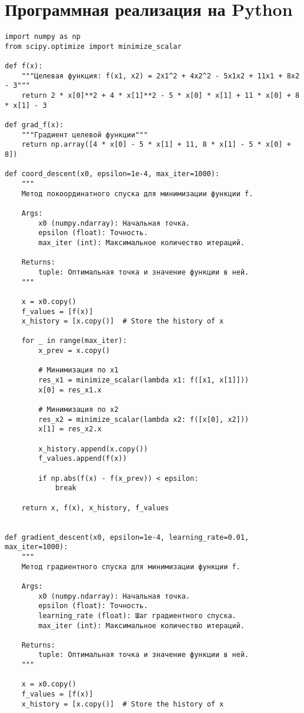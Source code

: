 \documentclass{article}
\begin{document}
\section{Программная реализация на Python}
\begin{lstlisting}
import numpy as np
from scipy.optimize import minimize_scalar

def f(x):
    """Целевая функция: f(x1, x2) = 2x1^2 + 4x2^2 - 5x1x2 + 11x1 + 8x2 - 3"""
    return 2 * x[0]**2 + 4 * x[1]**2 - 5 * x[0] * x[1] + 11 * x[0] + 8 * x[1] - 3

def grad_f(x):
    """Градиент целевой функции"""
    return np.array([4 * x[0] - 5 * x[1] + 11, 8 * x[1] - 5 * x[0] + 8])

def coord_descent(x0, epsilon=1e-4, max_iter=1000):
    """
    Метод покоординатного спуска для минимизации функции f.

    Args:
        x0 (numpy.ndarray): Начальная точка.
        epsilon (float): Точность.
        max_iter (int): Максимальное количество итераций.

    Returns:
        tuple: Оптимальная точка и значение функции в ней.
    """

    x = x0.copy()
    f_values = [f(x)]
    x_history = [x.copy()]  # Store the history of x

    for _ in range(max_iter):
        x_prev = x.copy()

        # Минимизация по x1
        res_x1 = minimize_scalar(lambda x1: f([x1, x[1]]))
        x[0] = res_x1.x

        # Минимизация по x2
        res_x2 = minimize_scalar(lambda x2: f([x[0], x2]))
        x[1] = res_x2.x

        x_history.append(x.copy())
        f_values.append(f(x))

        if np.abs(f(x) - f(x_prev)) < epsilon:
            break

    return x, f(x), x_history, f_values


def gradient_descent(x0, epsilon=1e-4, learning_rate=0.01, max_iter=1000):
    """
    Метод градиентного спуска для минимизации функции f.

    Args:
        x0 (numpy.ndarray): Начальная точка.
        epsilon (float): Точность.
        learning_rate (float): Шаг градиентного спуска.
        max_iter (int): Максимальное количество итераций.

    Returns:
        tuple: Оптимальная точка и значение функции в ней.
    """

    x = x0.copy()
    f_values = [f(x)]
    x_history = [x.copy()]  # Store the history of x


\end{lstlisting}
\end{document}
